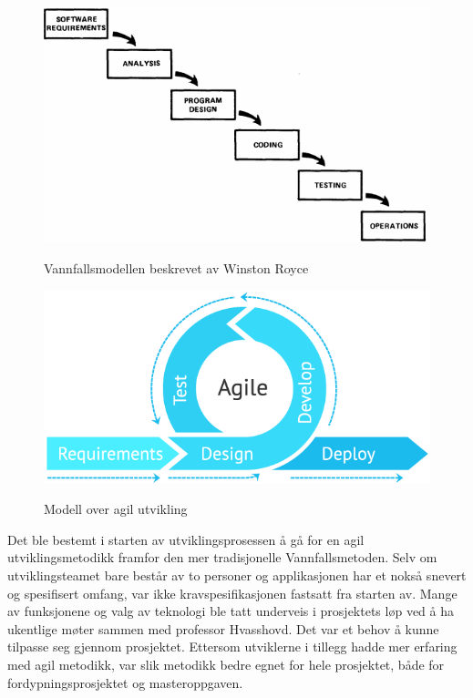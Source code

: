 \begin{figure}[H]
  \centering
  \begin{minipage}[b]{0.45\textwidth}
    \centering
    \includegraphics[scale=0.4]{Figurer/diagram/waterfall-model.png}
    \caption{Vannfallsmodellen beskrevet av Winston Royce}
    \label{fig:waterfall-model}
  \end{minipage}
  \hfill
  \begin{minipage}[b]{0.45\textwidth}
    \centering
    \includegraphics[scale=0.3]{Figurer/diagram/agile-dev.png}
    \caption{Modell over agil utvikling}
    \label{fig:agile-dev}
  \end{minipage}
\end{figure}
\noindent
Det ble bestemt i starten av utviklingsprosessen å gå for en agil utviklingsmetodikk framfor den mer tradisjonelle Vannfallsmetoden. Selv om utviklingsteamet bare består av to personer og applikasjonen har et nokså snevert og spesifisert omfang, var ikke kravspesifikasjonen fastsatt fra starten av. Mange av funksjonene og valg av teknologi ble tatt underveis i prosjektets løp ved å ha ukentlige møter sammen med professor Hvasshovd. Det var et behov å kunne tilpasse seg gjennom prosjektet. Ettersom utviklerne i tillegg hadde mer erfaring med agil metodikk, var slik metodikk bedre egnet for hele prosjektet, både for fordypningsprosjektet og masteroppgaven.

